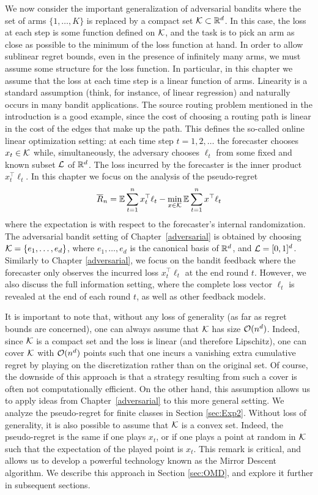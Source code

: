 We now consider the important generalization of adversarial bandits where the set of arms $\{1,\hdots,K\}$ is replaced by a compact set $\mathcal{K} \subset \mathbb{R}^d$. In this case, the loss at each step is some function defined on $\mathcal{K}$, and the task is to pick an arm as close as possible to the minimum of the loss function at hand. In order to allow sublinear regret bounds, even in the presence of infinitely many arms, we must assume some structure for the loss function. In particular, in this chapter we assume that the loss at each time step is a linear function of arms. Linearity is a standard assumption (think, for instance, of linear regression) and naturally occurs in many bandit applications. The source routing problem mentioned in the introduction is a good example, since the cost of choosing a routing path is linear in the cost of the edges that make up the path. This defines the so-called online linear optimization setting: at each time step $t=1,2, \hdots$ the forecaster chooses $x_t \in \mathcal{K}$ while, simultaneously, the adversary chooses $\ell_t$ from some fixed and known subset $\mathcal{L}$ of $\mathbb{R}^d$. The loss incurred by the forecaster is the inner product $x_t^{\top}\ell_t$. In this chapter we focus on the analysis of the pseudo-regret
$$\overline{R}_n = \mathbb{E} \sum_{t=1}^n x_t^{\top} \ell_t - \min_{x \in \mathcal{K}} \mathbb{E} \sum_{t=1}^n x^{\top} \ell_t$$
where the expectation is with respect to the forecaster's internal randomization.
The adversarial bandit setting of Chapter~\ref{adversarial} is obtained by choosing $\mathcal{K}=\{e_1, \hdots, e_d\}$, where $e_1, \hdots, e_d$ is the canonical basis of $\mathbb{R}^d$, and $\mathcal{L}=[0,1]^d$. Similarly to Chapter \ref{adversarial}, we focus on the bandit feedback where the forecaster only observes the incurred loss $x_t^{\top} \ell_t$ at the end round $t$. However, we also discuss the full information setting, where the complete loss vector $\ell_t$ is revealed at the end of each round $t$, as well as other feedback models.

It is important to note that, without any loss of generality (as far as regret bounds are concerned), one can always assume that $\mathcal{K}$ has size $\mathcal{O}(n^d)$. Indeed, since $\mathcal{K}$ is a compact set and the loss is linear (and therefore Lipschitz), one can cover $\mathcal{K}$ with $\mathcal{O}(n^d)$ points such that one incurs a vanishing extra cumulative regret by playing on the discretization rather than on the original set. Of course, the downside of this approach is that a strategy resulting from such a cover is often not computationally efficient. On the other hand, this assumption allows us to apply ideas from Chapter~\ref{adversarial} to this more general setting. We analyze the pseudo-regret for finite classes in Section \ref{sec:Exp2}. Without loss of generality, it is also possible to assume that $\mathcal{K}$ is a convex set. Indeed, the pseudo-regret is the same if one plays $x_t$, or if one plays a point at random in $\mathcal{K}$ such that the expectation of the played point is $x_t$. This remark is critical, and allows us to develop a powerful technology known as the Mirror Descent algorithm. We describe this approach in Section \ref{sec:OMD}, and explore it further in subsequent sections.

